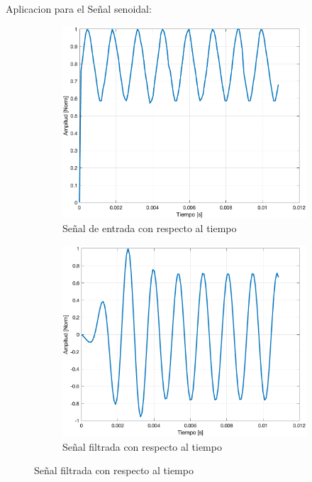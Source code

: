\documentclass{article}
\begin{document}
Aplicacion para el Señal senoidal:
\begin{figure}[H]
    \centering
    \begin{subfigure}{.3\textwidth}
        \centering
        \includegraphics[width=\linewidth]{images/V1_entrada.png}
        \caption{Señal de entrada con respecto al tiempo}
        \label{fig:triangular_1}
    \end{subfigure}
    \hfill
    \begin{subfigure}{.3\textwidth}
        \centering
        \includegraphics[width=\linewidth]{images/V1_Salida.png}
        \caption{Señal filtrada con respecto al tiempo}
        \label{fig:triangular_2}

\end{subfigure}
\end{figure}
\end{document}

